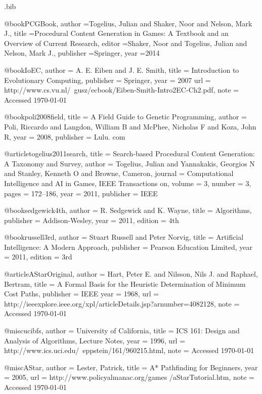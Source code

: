\begin{filecontents*}{\jobname.bib}

@book{PCGBook,
	author	={Togelius, Julian and Shaker, Noor and Nelson, Mark J.},
	title		={{P}rocedural {C}ontent {G}eneration in {G}ames: {A} {T}extbook and an {O}verview of {C}urrent {R}esearch},
	editor		={Shaker, Noor and Togelius, Julian and Nelson, Mark J.},
	publisher	={Springer},
	year		={2014}
}

@book{IoEC,
	author 	= {A. E. Eiben and J. E. Smith},
	title 		= {{I}ntroduction to {E}volutionary {C}omputing},
	publisher 	= {Springer},
	year 		= {2007}
	url 		= {http://www.cs.vu.nl/~gusz/ecbook/Eiben-Smith-Intro2EC-Ch2.pdf},
	note		= {Accessed \today}
}

@book{poli2008field,
	title		= {{A} {F}ield {G}uide to {G}enetic {P}rogramming},
	author	= {Poli, Riccardo and Langdon, William B and McPhee, Nicholas F and Koza, John R},
	year		= {2008},
	publisher	= {Lulu. com}
}

@article{togelius2011search,
	title 		= {{S}earch-based {P}rocedural {C}ontent {G}eneration: {A} {T}axonomy and {S}urvey},
	author 	= {Togelius, Julian and Yannakakis, Georgios N and Stanley, Kenneth O and Browne, Cameron},
	journal 	= {Computational Intelligence and AI in Games, IEEE Transactions on},
	volume 	= {3},
	number	= {3},
	pages		= {172--186},
	year		= {2011},
	publisher	= {IEEE}
}

@book{sedgewick4th,
	author	= {R. Sedgewick and K. Wayne},
	title		= {{A}lgorithms},
	publisher	= {Addison-Wesley},
	year		= {2011},
	edition	= {4th}
}

@book{russell3rd,
	author	= {Stuart Russell and Peter Norvig},
	title		= {{A}rtificial {I}ntelligence: {A} {M}odern {A}pproach},
	publisher	= {Pearson Education Limited},
	year		= {2011},
	edition	= {3rd}
}


@article{AStarOriginal,
	author 	= {Hart, Peter E. and Nilsson, Nils J. and Raphael, Bertram},
	title 		= {{A} {F}ormal {B}asis for the {H}euristic {D}etermination of {M}inimum {C}ost {P}aths},
	publisher	= {IEEE}
	year 		= {1968}, 
	url 		= {http://ieeexplore.ieee.org/xpl/articleDetails.jsp?arnumber=4082128},
	note		= {Accessed \today}
}

@misc{ucibfs,
	author 	= {University of California},
	title 		= {{I}{C}{S} 161: {D}esign and {A}nalysis of {A}lgorithms, {L}ecture {N}otes},
	year 		= {1996}, 
	url 		= {http://www.ics.uci.edu/~eppstein/161/960215.html},
	note		= {Accessed \today}
}

@misc{AStar,
	author 	= {Lester, Patrick},
	title 		= {{A}* {P}athfinding for {B}eginners},
	year 		= {2005}, 
	url 		= {http://www.policyalmanac.org/games /aStarTutorial.htm},
	note		= {Accessed \today}
}


\end{filecontents*}
